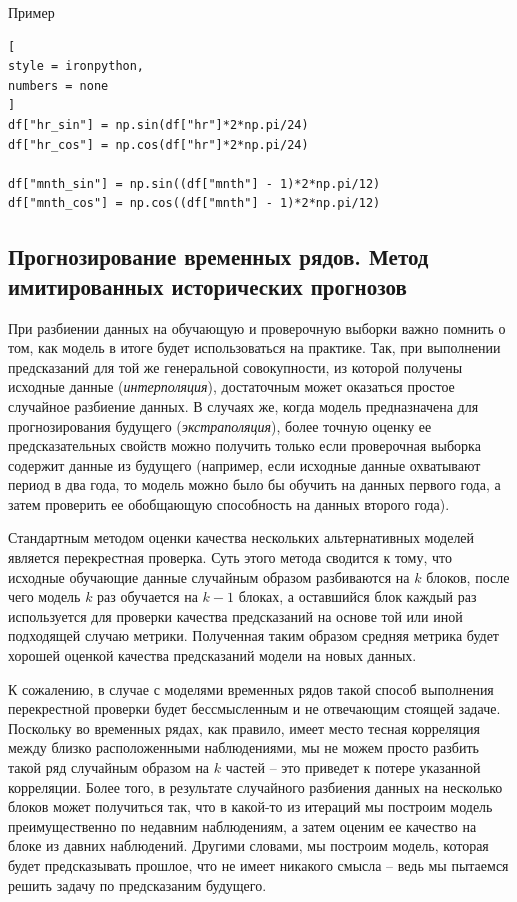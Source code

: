\documentclass[%
	11pt,
	a4paper,
	utf8,
		]{article}
\begin{document}
Пример
\begin{lstlisting}[
style = ironpython,
numbers = none	
]
df["hr_sin"] = np.sin(df["hr"]*2*np.pi/24)
df["hr_cos"] = np.cos(df["hr"]*2*np.pi/24)

df["mnth_sin"] = np.sin((df["mnth"] - 1)*2*np.pi/12)
df["mnth_cos"] = np.cos((df["mnth"] - 1)*2*np.pi/12)
\end{lstlisting}


\subsection{Прогнозирование временных рядов. Метод имитированных исторических прогнозов}

При разбиении данных на обучающую и проверочную выборки важно помнить о том, как модель в итоге будет использоваться на практике. Так, при выполнении предсказаний для той же генеральной совокупности, из которой получены исходные данные (\emph{интерполяция}), достаточным может оказаться простое случайное разбиение данных. В случаях же, когда модель предназначена для прогнозирования будущего (\emph{экстраполяция}), более точную оценку ее предсказательных свойств можно получить только если проверочная выборка содержит данные из будущего (например, если исходные данные охватывают период в два года, то модель можно было бы обучить на данных первого года, а затем проверить ее обобщающую способность на данных второго года).

Стандартным методом оценки качества нескольких альтернативных моделей является перекрестная проверка. Суть этого метода сводится к тому, что исходные обучающие данные случайным образом разбиваются на $ k $ блоков, после чего модель $ k $ раз обучается на $ k - 1 $ блоках, а оставшийся блок каждый раз используется для проверки качества предсказаний на основе той или иной подходящей случаю метрики. Полученная таким образом средняя метрика будет хорошей оценкой качества предсказаний модели на новых данных.

К сожалению, в случае с моделями временных рядов такой способ выполнения перекрестной проверки будет бессмысленным и не отвечающим стоящей задаче. Поскольку во временных рядах, как правило, имеет место тесная корреляция между близко расположенными наблюдениями, мы не можем просто разбить такой ряд случайным образом на $ k $ частей -- это приведет к потере указанной корреляции. Более того, в результате случайного разбиения данных на несколько блоков может получиться так, что в какой-то из итераций мы построим модель преимущественно по недавним наблюдениям, а затем оценим ее качество на блоке из давних наблюдений. Другими словами, мы построим модель, которая будет предсказывать прошлое, что не имеет никакого смысла -- ведь мы пытаемся решить задачу по предсказаним будущего.
\end{document}
